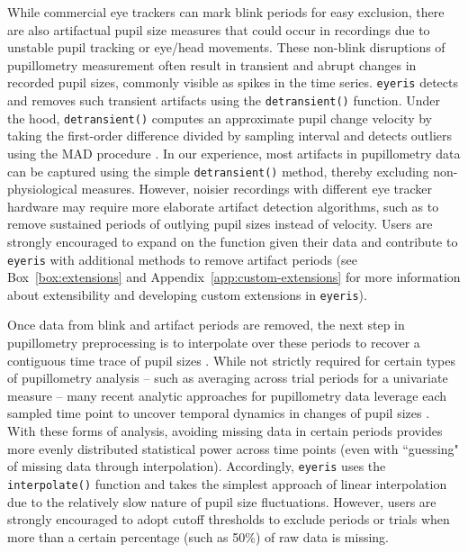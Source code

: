 While commercial eye trackers can mark blink periods for easy exclusion, there are also artifactual pupil size measures that could occur in recordings due to unstable pupil tracking or eye/head movements. These non-blink disruptions of pupillometry measurement often result in transient and abrupt changes in recorded pupil sizes, commonly visible as spikes in the time series. \texttt{eyeris} detects and removes such transient artifacts using the \texttt{detransient()} function. Under the hood, \texttt{detransient()} computes an approximate pupil change velocity by taking the first-order difference divided by sampling interval and detects outliers using the MAD procedure \parencite{arachchige2024confidence,hampel1968contributions,hampel1974influence,leys2013detecting,rousseeuw1993alternatives,rousseeuw1986robust}. In our experience, most artifacts in pupillometry data can be captured using the simple \texttt{detransient()} method, thereby excluding non-physiological measures. However, noisier recordings with different eye tracker hardware may require more elaborate artifact detection algorithms, such as to remove sustained periods of outlying pupil sizes instead of velocity. Users are strongly encouraged to expand on the function given their data and contribute to \texttt{eyeris} with additional methods to remove artifact periods (see Box~\ref{box:extensions} and Appendix~\ref{app:custom-extensions} for more information about extensibility and developing custom extensions in \texttt{eyeris}).


Once data from blink and artifact periods are removed, the next step in pupillometry preprocessing is to interpolate over these periods to recover a contiguous time trace of pupil sizes \parencite{mathot2013simple}. While not strictly required for certain types of pupillometry analysis – such as averaging across trial periods for a univariate measure – many recent analytic approaches for pupillometry data leverage each sampled time point to uncover temporal dynamics in changes of pupil sizes \parencite{clewett2020pupil,johansson2018pupil,steinhauer2004sympathetic,urai2017pupil,vanslooten2018how,verney2004pupillary,widmann2018emotion}. With these forms of analysis, avoiding missing data in certain periods provides more evenly distributed statistical power across time points (even with ``guessing" of missing data through interpolation). Accordingly, \texttt{eyeris} uses the \texttt{interpolate()} function and takes the simplest approach of linear interpolation due to the relatively slow nature of pupil size fluctuations. However, users are strongly encouraged to adopt cutoff thresholds to exclude periods or trials when more than a certain percentage (such as 50\%) of raw data is missing.

